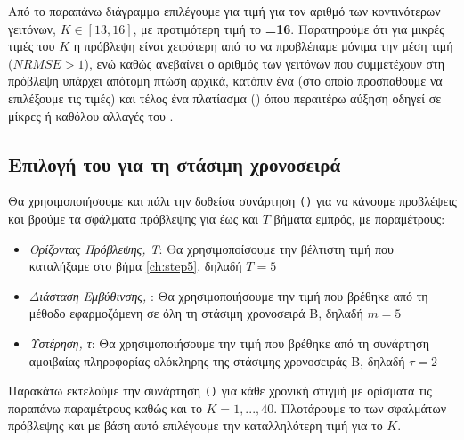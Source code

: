 Από το παραπάνω διάγραμμα επιλέγουμε για τιμή για τον αριθμό των κοντινότερων γειτόνων, $K \in [13, 16]$, με προτιμότερη τιμή το \textbf{=16}. Παρατηρούμε ότι για μικρές τιμές του $K$ η πρόβλεψη είναι χειρότερη από το να προβλέπαμε μόνιμα την μέση τιμή ($NRMSE>1$), ενώ καθώς ανεβαίνει ο αριθμός των γειτόνων που συμμετέχουν στη πρόβλεψη υπάρχει απότομη πτώση αρχικά, κατόπιν ένα  (στο οποίο προσπαθούμε να επιλέξουμε τις τιμές) και τέλος ένα πλατίασμα () όπου περαιτέρω αύξηση οδηγεί σε μίκρες ή καθόλου αλλαγές του .

\subsection{Επιλογή του  για τη στάσιμη χρονοσειρά }

Θα χρησιμοποιήσουμε και πάλι την δοθείσα συνάρτηση \texttt{()} για να κάνουμε προβλέψεις και βρούμε τα σφάλματα πρόβλεψης για έως και $T$ βήματα εμπρός, με παραμέτρους:
\begin{itemize}
    \item \textit{Ορίζοντας Πρόβλεψης, Τ}: Θα χρησιμοποίσουμε την βέλτιστη τιμή που καταλήξαμε στο βήμα \ref{ch:step5}, δηλαδή $T=5$
    \item \textit{Διάσταση Εμβύθινσης, }: Θα χρησιμοποιήσουμε την τιμή που βρέθηκε από τη μέθοδο  εφαρμοζόμενη σε όλη τη στάσιμη χρονοσειρά Β, δηλαδή $m=5$
    \item \textit{Υστέρηση, τ}: Θα χρησιμοποιήσουμε την τιμή που βρέθηκε από τη συνάρτηση αμοιβαίας πληροφορίας ολόκληρης της στάσιμης χρονοσειράς Β, δηλαδή $\tau=2$
\end{itemize}

Παρακάτω εκτελούμε την συνάρτηση \texttt{()}  για κάθε χρονική στιγμή με ορίσματα τις παραπάνω παραμέτρους καθώς και το $K=1,...,40$. Πλοτάρουμε το  των σφαλμάτων πρόβλεψης και με βάση αυτό επιλέγουμε την καταλληλότερη τιμή για το $K$.

